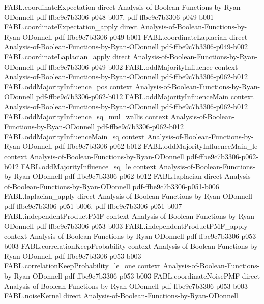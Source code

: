\begin{theorem}
\proofstep
  {FABL.coordinateExpectation}
  {direct}
  {Analysis-of-Boolean-Functions-by-Ryan-ODonnell}
  {pdf-ffbe9c7b3306-p048-b007,
    pdf-ffbe9c7b3306-p049-b001}
\proofstep
  {FABL.coordinateExpectation_apply}
  {direct}
  {Analysis-of-Boolean-Functions-by-Ryan-ODonnell}
  {pdf-ffbe9c7b3306-p049-b001}
\proofstep
  {FABL.coordinateLaplacian}
  {direct}
  {Analysis-of-Boolean-Functions-by-Ryan-ODonnell}
  {pdf-ffbe9c7b3306-p049-b002}
\proofstep
  {FABL.coordinateLaplacian_apply}
  {direct}
  {Analysis-of-Boolean-Functions-by-Ryan-ODonnell}
  {pdf-ffbe9c7b3306-p049-b002}
\proofstep
  {FABL.oddMajorityInfluence}
  {context}
  {Analysis-of-Boolean-Functions-by-Ryan-ODonnell}
  {pdf-ffbe9c7b3306-p062-b012}
\proofstep
  {FABL.oddMajorityInfluence_pos}
  {context}
  {Analysis-of-Boolean-Functions-by-Ryan-ODonnell}
  {pdf-ffbe9c7b3306-p062-b012}
\proofstep
  {FABL.oddMajorityInfluenceMain}
  {context}
  {Analysis-of-Boolean-Functions-by-Ryan-ODonnell}
  {pdf-ffbe9c7b3306-p062-b012}
\proofstep
  {FABL.oddMajorityInfluence_sq_mul_wallis}
  {context}
  {Analysis-of-Boolean-Functions-by-Ryan-ODonnell}
  {pdf-ffbe9c7b3306-p062-b012}
\proofstep
  {FABL.oddMajorityInfluenceMain_sq}
  {context}
  {Analysis-of-Boolean-Functions-by-Ryan-ODonnell}
  {pdf-ffbe9c7b3306-p062-b012}
\proofstep
  {FABL.oddMajorityInfluenceMain_le}
  {context}
  {Analysis-of-Boolean-Functions-by-Ryan-ODonnell}
  {pdf-ffbe9c7b3306-p062-b012}
\proofstep
  {FABL.oddMajorityInfluence_sq_le}
  {context}
  {Analysis-of-Boolean-Functions-by-Ryan-ODonnell}
  {pdf-ffbe9c7b3306-p062-b012}
\proofstep
  {FABL.laplacian}
  {direct}
  {Analysis-of-Boolean-Functions-by-Ryan-ODonnell}
  {pdf-ffbe9c7b3306-p051-b006}
\proofstep
  {FABL.laplacian_apply}
  {direct}
  {Analysis-of-Boolean-Functions-by-Ryan-ODonnell}
  {pdf-ffbe9c7b3306-p051-b006,
    pdf-ffbe9c7b3306-p051-b007}
\proofstep
  {FABL.independentProductPMF}
  {context}
  {Analysis-of-Boolean-Functions-by-Ryan-ODonnell}
  {pdf-ffbe9c7b3306-p053-b003}
\proofstep
  {FABL.independentProductPMF_apply}
  {context}
  {Analysis-of-Boolean-Functions-by-Ryan-ODonnell}
  {pdf-ffbe9c7b3306-p053-b003}
\proofstep
  {FABL.correlationKeepProbability}
  {context}
  {Analysis-of-Boolean-Functions-by-Ryan-ODonnell}
  {pdf-ffbe9c7b3306-p053-b003}
\proofstep
  {FABL.correlationKeepProbability_le_one}
  {context}
  {Analysis-of-Boolean-Functions-by-Ryan-ODonnell}
  {pdf-ffbe9c7b3306-p053-b003}
\proofstep
  {FABL.coordinateNoisePMF}
  {direct}
  {Analysis-of-Boolean-Functions-by-Ryan-ODonnell}
  {pdf-ffbe9c7b3306-p053-b003}
\proofstep
  {FABL.noiseKernel}
  {direct}
  {Analysis-of-Boolean-Functions-by-Ryan-ODonnell}

\end{theorem}
